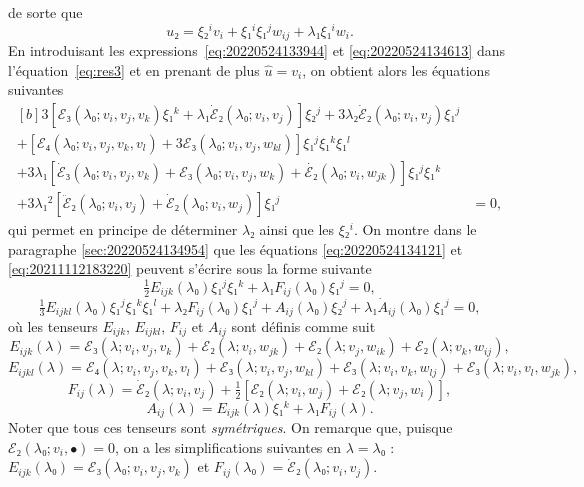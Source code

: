 \documentclass[12pt, final]{amsart}
\theoremstyle{definition}
\begin{document}
de sorte que
\begin{equation}
  \label{eq:20220524134613}
  u₂ = ξ₂^i v_i + ξ₁^i ξ₁^j w_{ij} + λ₁ ξ₁^i w_i .
\end{equation}
En introduisant les expressions~\eqref{eq:20220524133944} et
\eqref{eq:20220524134613} dans l'équation~\eqref{eq:res3} et en prenant de plus
\(\hat{u} = v_i\), on obtient alors les équations suivantes
\begin{equation}
  \label{eq:20211112183220}
  \begin{aligned}[b]
    3[ℰ₃(λ₀; v_i, v_j, v_k) ξ₁^k + λ₁ \dot{ℰ}₂(λ₀; v_i, v_j)] ξ₂^j + 3λ₂ \dot{ℰ}₂(λ₀; v_i, v_j) ξ₁^j &\\
    + [ℰ₄(λ₀; v_i, v_j, v_k, v_l) + 3ℰ₃(λ₀; v_i, v_j, w_{kl})] ξ₁^j ξ₁^k ξ₁^l &\\
    + 3λ₁ [\dot{ℰ}₃(λ₀; v_i, v_j, v_k) + ℰ₃(λ₀; v_i, v_j, w_k) + \dot{ℰ₂}(λ₀; v_i, w_{jk})] ξ₁^j ξ₁^k&\\
    + 3λ₁^2 [\ddot{ℰ}₂(λ₀; v_i, v_j) + \dot{ℰ}₂(λ₀ ; v_i, w_j)] ξ₁^j &= 0,
  \end{aligned}
\end{equation}
qui permet en principe de déterminer \(λ₂\) ainsi que les \(ξ₂^i\). On montre
dans le paragraphe \ref{sec:20220524134954} que les équations
\eqref{eq:20220524134121} et \eqref{eq:20211112183220} peuvent s'écrire sous la
forme suivante
\begin{equation}
  \label{eq:20220524135036}
  \tfrac{1}{2} E_{ijk}(λ₀) ξ₁^j ξ₁^k + λ₁ F_{ij}(λ₀) ξ₁^j = 0,
\end{equation}
\begin{equation}
  \label{eq:20220601070917}
  \tfrac{1}{3} E_{ijkl}(λ₀) ξ₁^j ξ₁^k ξ₁^l + λ₂ F_{ij}(λ₀) ξ₁^j + A_{ij}(λ₀) ξ₂^j + λ₁ \dot{A}_{ij}(λ₀) ξ₁^j = 0,
\end{equation}
où les tenseurs \(E_{i j k}\), \(E_{i j k l}\), \(F_{i j}\) et \(A_{i j}\) sont
définis comme suit 
\begin{equation}
  \label{eq:20220524135619}
  E_{ijk}(λ) = ℰ₃(λ; v_i, v_j, v_k) + ℰ₂(λ; v_i, w_{jk}) + ℰ₂(λ; v_j, w_{ik}) + ℰ₂(λ ; v_k, w_{ij}),
\end{equation}
\begin{equation}
  \label{eq:20220524135553}
  E_{i j k l}(λ) = ℰ₄(λ ; v_i, v_j, v_k, v_l) + ℰ₃(λ ; v_i, v_j, w_{k l}) + ℰ₃(λ ; v_i, v_k, w_{l j}) + ℰ₃(λ ; v_i, v_l, w_{j k}),
\end{equation}
\begin{equation}
  \label{eq:20220524135643}
  F_{ij}(λ) = \dot{ℰ}₂(λ; v_i, v_j) + \tfrac{1}{2} [ℰ₂(λ; v_i, w_j) + ℰ₂(λ; v_j, w_i)],
\end{equation}
\begin{equation}
  \label{eq:20220524135705}
  A_{ij}(λ) = E_{ijk}(λ) ξ₁^k + λ₁ F_{ij}(λ) .
\end{equation}
Noter que tous ces tenseurs sont \emph{symétriques}. On remarque que, puisque
\(ℰ₂(λ₀ ; v_i, •) = 0\), on a les simplifications suivantes en \(λ = λ₀\) :
\(E_{ijk}(λ₀) = ℰ₃(λ₀; v_i, v_j, v_k)\) et
\(F_{ij}(λ₀) = \dot{ℰ}₂(λ₀; v_i, v_j)\).
\end{document}
